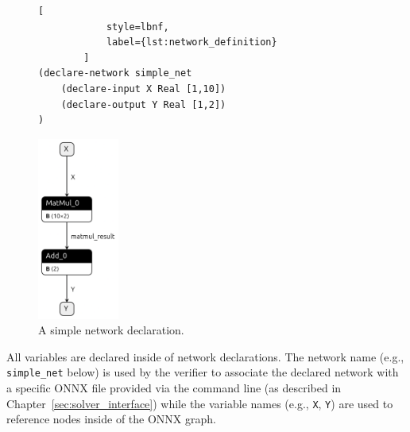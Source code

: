 \begin{figure}[h!]
    \begin{minipage}[c]{0.6\textwidth}
        \begin{lstlisting}[
            style=lbnf,
            label={lst:network_definition}
        ]
(declare-network simple_net
    (declare-input X Real [1,10])
    (declare-output Y Real [1,2])
)\end{lstlisting}
    \end{minipage}%
    \begin{minipage}[c]{0.45\textwidth}
        \centering
        \includegraphics[height=6cm]{imgs/simple_net.onnx.png}
    \end{minipage}
    \caption{A simple \vnnlib{} network declaration.}
    \label{fig:simple_net}
\end{figure}

All variables are declared inside of network declarations.  The network name (e.g., \texttt{simple\_net} below) is used by the verifier to 
associate the declared network with a specific ONNX file provided via the command line (as described in Chapter~\ref{sec:solver_interface}) while the variable names 
(e.g., \texttt{X}, \texttt{Y}) are used to reference nodes inside of the ONNX graph. 

